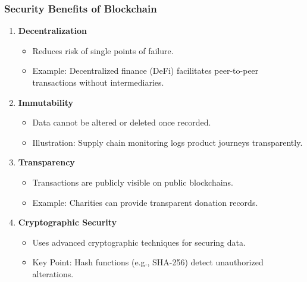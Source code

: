 \documentclass{beamer}
\begin{document}
\begin{frame}[fragile]
    \frametitle{Security Benefits of Blockchain}
    \begin{enumerate}
        \item \textbf{Decentralization}
            \begin{itemize}
                \item Reduces risk of single points of failure.
                \item Example: Decentralized finance (DeFi) facilitates peer-to-peer transactions without intermediaries.
            \end{itemize}
        
        \item \textbf{Immutability}
            \begin{itemize}
                \item Data cannot be altered or deleted once recorded.
                \item Illustration: Supply chain monitoring logs product journeys transparently.
            \end{itemize}
        
        \item \textbf{Transparency}
            \begin{itemize}
                \item Transactions are publicly visible on public blockchains.
                \item Example: Charities can provide transparent donation records.
            \end{itemize}
        
        \item \textbf{Cryptographic Security}
            \begin{itemize}
                \item Uses advanced cryptographic techniques for securing data.
                \item Key Point: Hash functions (e.g., SHA-256) detect unauthorized alterations.
            \end{itemize}
    \end{enumerate}
\end{frame}
\end{document}
